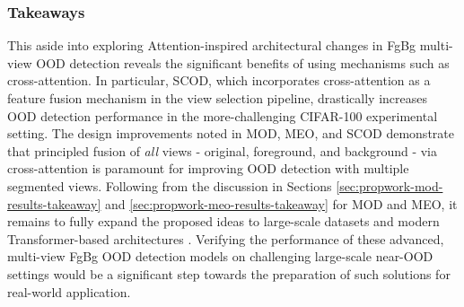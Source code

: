 %

\subsubsection{Takeaways} 
This aside into exploring Attention-inspired architectural changes in FgBg multi-view OOD detection reveals the significant benefits of using mechanisms such as cross-attention. In particular, SCOD, which incorporates cross-attention as a feature fusion mechanism in the view selection pipeline, drastically increases OOD detection performance in the more-challenging CIFAR-100 experimental setting. The design improvements noted in MOD, MEO, and SCOD demonstrate that principled fusion of \emph{all} views - original, foreground, and background - via cross-attention is paramount for improving OOD detection with multiple segmented views. Following from the discussion in Sections \ref{sec:propwork-mod-results-takeaway} and \ref{sec:propwork-meo-results-takeaway} for MOD and MEO, it remains to fully expand the proposed ideas to large-scale datasets and modern Transformer-based architectures \cite{vaswani2017attention,dosovitskiy2020image}. Verifying the performance of these advanced, multi-view FgBg OOD detection models on challenging large-scale near-OOD settings would be a significant step towards the preparation of such solutions for real-world application. 
